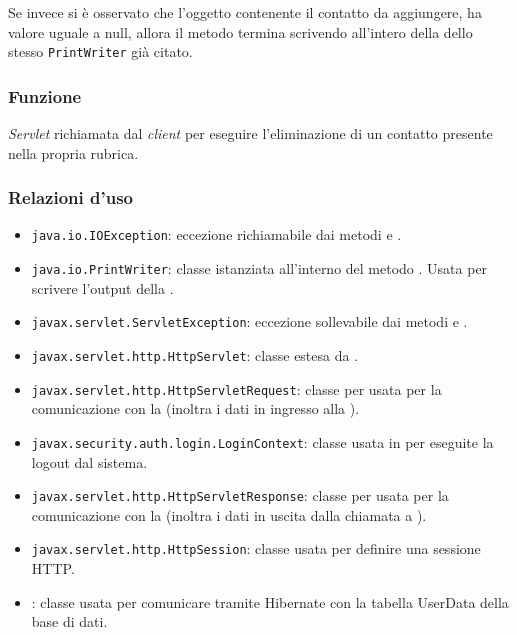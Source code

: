 \begin{description}
	Se invece si è osservato che l'oggetto contenente il contatto da aggiungere, ha valore uguale a null, allora il metodo termina scrivendo  all'intero della dello stesso \texttt{PrintWriter} già citato.
\end{description}



\subsubsection*{Funzione}
\textit{Servlet} richiamata dal \textit{client} per eseguire l'eliminazione di un contatto presente nella propria rubrica.

\subsubsection*{Relazioni d'uso}

\begin{itemize}
	\item \texttt{java.io.IOException}: eccezione richiamabile dai metodi  e .
	\item \texttt{java.io.PrintWriter}: classe istanziata all'interno del metodo . Usata per scrivere l'output della .
	\item \texttt{javax.servlet.ServletException}: eccezione sollevabile dai metodi  e .
	\item \texttt{javax.servlet.http.HttpServlet}: classe estesa da .
	\item \texttt{javax.servlet.http.HttpServletRequest}:  classe per usata per la comunicazione con la  (inoltra i dati in ingresso alla ).
	\item \texttt{javax.security.auth.login.LoginContext}: classe usata in  per eseguite la logout dal sistema.
	\item \texttt{javax.servlet.http.HttpServletResponse}: classe per usata per la comunicazione con la  (inoltra i dati in uscita dalla chiamata a ).
	\item \texttt{javax.servlet.http.HttpSession}: classe usata per definire una sessione HTTP.
	\item {}: classe usata per comunicare tramite Hibernate con la tabella UserData della base di dati.
\end{itemize}


